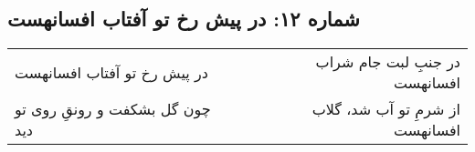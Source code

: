 \begin{center}
\section*{شماره ۱۲: در پیش رخ تو آفتاب افسانهست}
\label{sec:012}
\begin{longtable}{l p{0.5cm} r}
در پیش رخ تو آفتاب افسانهست
&&
در جنبِ لبت جام شراب افسانهست
\\
چون گل بشکفت و رونقِ روی تو دید
&&
از شرمِ تو آب شد، گلاب افسانهست
\\
\end{longtable}
\end{center}
